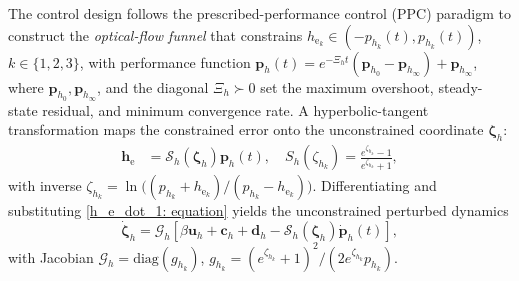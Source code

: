 \documentclass{IEEEtaes}
\theoremstyle{definition}
\theoremstyle{remark}
\begin{document}
The control design follows the prescribed-performance control (PPC) paradigm \cite{lin2022} to construct the \emph{optical-flow funnel} that constrains $h_{\text{e}_k}\in(-p_{h_k}(t),p_{h_k}(t))$, $k\in\{1,2,3\}$, with performance function $\boldsymbol{p}_h(t) = e^{-\Xi_h t}(\boldsymbol{p}_{h_0}-\boldsymbol{p}_{h_\infty})+\boldsymbol{p}_{h_\infty}$, where $\boldsymbol{p}_{h_0},\boldsymbol{p}_{h_\infty}$, and the diagonal $\Xi_h\succ 0$ set the maximum overshoot, steady-state residual, and minimum convergence rate. A hyperbolic-tangent transformation maps the constrained error onto the unconstrained coordinate $\boldsymbol{\zeta}_h$:
\begin{align}
    \label{optical flow error transformation: equation}
    \boldsymbol{h}_\text{e} &= \mathcal{S}_h(\boldsymbol{\zeta}_h)\boldsymbol{p}_h(t),\quad S_h(\zeta_{h_k}) = \frac{e^{\zeta_{h_k}}-1}{e^{\zeta_{h_k}}+1},
\end{align}
with inverse $\zeta_{h_k}=\ln\!\big((p_{h_k}+h_{\text{e}_k})/(p_{h_k}-h_{\text{e}_k})\big)$. Differentiating and substituting \eqref{h_e_dot_1: equation} yields the unconstrained perturbed dynamics
\begin{equation} \label{unconstrained system: equation}
    \dot{\boldsymbol{\zeta}}_h = \mathcal{G}_h\!\left[\beta\boldsymbol{u}_h + \boldsymbol{c}_h + \boldsymbol{d}_h - \mathcal{S}_h(\boldsymbol{\zeta}_h)\dot{\boldsymbol{p}}_h(t)\right],
\end{equation}
with Jacobian $\mathcal{G}_h=\text{diag}(g_{h_k})$, $g_{h_k}=(e^{\zeta_{h_k}}+1)^2/(2e^{\zeta_{h_k}}p_{h_k})$.
\end{document}
